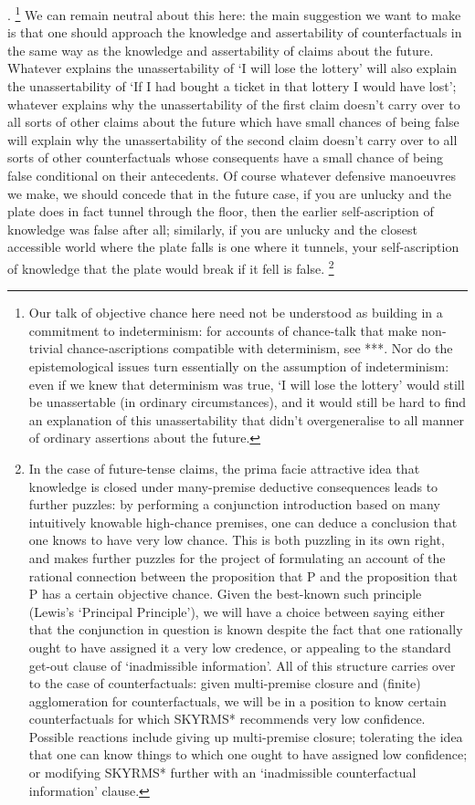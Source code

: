 \documentclass[If.tex]{subfiles}
\begin{document}
\cite{HawthorneKL}.%
\footnote{Our talk of objective chance here need not be understood as building in a commitment to indeterminism: for accounts of chance-talk that make non-trivial chance-ascriptions compatible with determinism, see ***. Nor do the epistemological issues turn essentially on the assumption of indeterminism: even if we knew that determinism was true, ‘I will lose the lottery’ would still be unassertable (in ordinary circumstances), and it would still be hard to find an explanation of this unassertability that didn't overgeneralise to all manner of ordinary assertions about the future.} 
We can remain neutral about this here: the main suggestion we want to make is that one should approach the knowledge and assertability of counterfactuals in the same way as the knowledge and assertability of claims about the future. Whatever explains the unassertability of ‘I will lose the lottery’ will also explain the unassertability of ‘If I had bought a ticket in that lottery I would have lost’; whatever explains why the unassertability of the first claim doesn't carry over to all sorts of other claims about the future which have small chances of being false will explain why the unassertability of the second claim doesn't carry over to all sorts of other counterfactuals whose consequents have a small chance of being false conditional on their antecedents. Of course whatever defensive manoeuvres we make, we should concede that in the future case, if you are unlucky and the plate does in fact tunnel through the floor, then the earlier self-ascription of knowledge was false after all; similarly, if you are unlucky and the closest accessible world where the plate falls is one where it tunnels, your self-ascription of knowledge that the plate would break if it fell is false.%
\footnote{In the case of future-tense claims, the prima facie attractive idea that knowledge is closed under many-premise deductive consequences leads to further puzzles: by performing a conjunction introduction based on many intuitively knowable high-chance premises, one can deduce a conclusion that one knows to have very low chance. This is both puzzling in its own right, and makes further puzzles for the project of formulating an account of the rational connection between the proposition that P and the proposition that P has a certain objective chance. Given the best-known such principle (Lewis's ‘Principal Principle’), we will have a choice between saying either that the conjunction in question is known despite the fact that one rationally ought to have assigned it a very low credence, or appealing to the standard get-out clause of ‘inadmissible information’. All of this structure carries over to the case of counterfactuals: given multi-premise closure and (finite) agglomeration for counterfactuals, we will be in a position to know certain counterfactuals for which SKYRMS* recommends very low confidence. Possible reactions include giving up multi-premise closure; tolerating the idea that one can know things to which one ought to have assigned low confidence; or modifying SKYRMS* further with an ‘inadmissible counterfactual information’ clause.}
\end{document}
